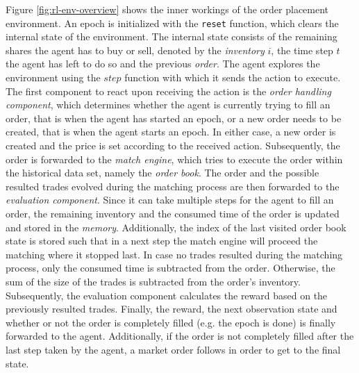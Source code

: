 Figure \ref{fig:rl-env-overview} shows the inner workings of the order placement environment.
An epoch is initialized with the \texttt{reset} function, which clears the internal state of the environment.
The internal state consists of the remaining shares the agent has to buy or sell, denoted by the \textit{inventory} $i$, the time step $t$ the agent has left to do so and the previous \textit{order}.
The agent explores the environment using the $step$ function with which it sends the action to execute.
The first component to react upon receiving the action is the \textit{order handling component}, which determines whether the agent is currently trying to fill an order, that is when the agent has started an epoch, or a new order needs to be created, that is when the agent starts an epoch.
In either case, a new order is created and the price is set according to the received action.
Subsequently, the order is forwarded to the \textit{match engine}, which tries to execute the order within the historical data set, namely the \textit{order book}.
The order and the possible resulted trades evolved during the matching process are then forwarded to the \textit{evaluation component}.
Since it can take multiple steps for the agent to fill an order, the remaining inventory and the consumed time of the order is updated and stored in the \textit{memory}.
Additionally, the index of the last visited order book state is stored such that in a next step the match engine will proceed the matching where it stopped last.
In case no trades resulted during the matching process, only the consumed time is subtracted from the order.
Otherwise, the sum of the size of the trades is subtracted from the order's inventory.
Subsequently, the evaluation component calculates the reward based on the previously resulted trades.
Finally, the reward, the next observation state and whether or not the order is completely filled (e.g. the epoch is done) is finally forwarded to the agent.
Additionally, if the order is not completely filled after the last step taken by the agent, a market order follows in order to get to the final state.

